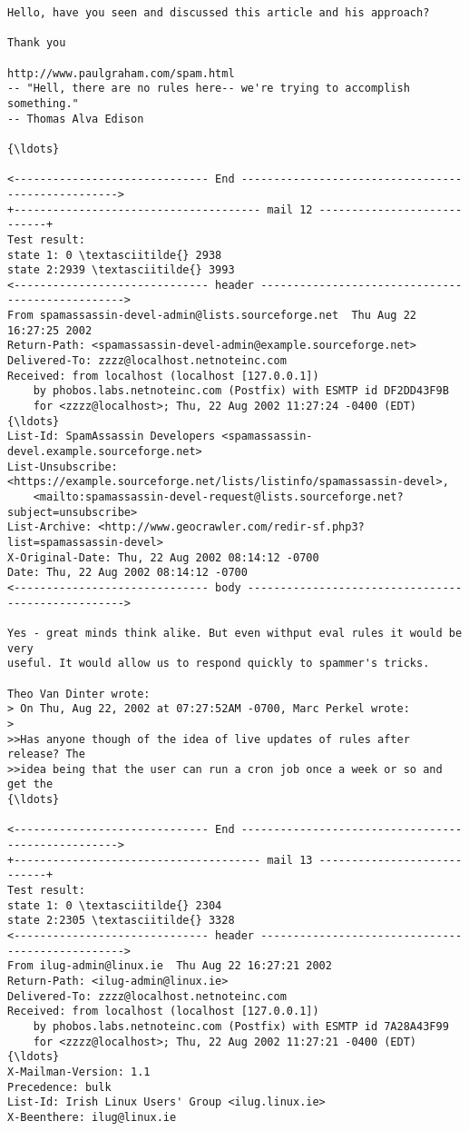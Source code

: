 \documentclass[11pt]{article}
\begin{document}
\begin{Verbatim}[commandchars=\\\{\}]
Hello, have you seen and discussed this article and his approach?

Thank you

http://www.paulgraham.com/spam.html
-- "Hell, there are no rules here-- we're trying to accomplish something."
-- Thomas Alva Edison

{\ldots}

<------------------------------ End --------------------------------------------------->
+-------------------------------------- mail 12 ----------------------------+
Test result:
state 1: 0 \textasciitilde{} 2938
state 2:2939 \textasciitilde{} 3993
<------------------------------ header ------------------------------------------------->
From spamassassin-devel-admin@lists.sourceforge.net  Thu Aug 22 16:27:25 2002
Return-Path: <spamassassin-devel-admin@example.sourceforge.net>
Delivered-To: zzzz@localhost.netnoteinc.com
Received: from localhost (localhost [127.0.0.1])
	by phobos.labs.netnoteinc.com (Postfix) with ESMTP id DF2DD43F9B
	for <zzzz@localhost>; Thu, 22 Aug 2002 11:27:24 -0400 (EDT)
{\ldots}
List-Id: SpamAssassin Developers <spamassassin-devel.example.sourceforge.net>
List-Unsubscribe: <https://example.sourceforge.net/lists/listinfo/spamassassin-devel>,
    <mailto:spamassassin-devel-request@lists.sourceforge.net?subject=unsubscribe>
List-Archive: <http://www.geocrawler.com/redir-sf.php3?list=spamassassin-devel>
X-Original-Date: Thu, 22 Aug 2002 08:14:12 -0700
Date: Thu, 22 Aug 2002 08:14:12 -0700
<------------------------------ body --------------------------------------------------->

Yes - great minds think alike. But even withput eval rules it would be very 
useful. It would allow us to respond quickly to spammer's tricks.

Theo Van Dinter wrote:
> On Thu, Aug 22, 2002 at 07:27:52AM -0700, Marc Perkel wrote:
> 
>>Has anyone though of the idea of live updates of rules after release? The 
>>idea being that the user can run a cron job once a week or so and get the 
{\ldots}

<------------------------------ End --------------------------------------------------->
+-------------------------------------- mail 13 ----------------------------+
Test result:
state 1: 0 \textasciitilde{} 2304
state 2:2305 \textasciitilde{} 3328
<------------------------------ header ------------------------------------------------->
From ilug-admin@linux.ie  Thu Aug 22 16:27:21 2002
Return-Path: <ilug-admin@linux.ie>
Delivered-To: zzzz@localhost.netnoteinc.com
Received: from localhost (localhost [127.0.0.1])
	by phobos.labs.netnoteinc.com (Postfix) with ESMTP id 7A28A43F99
	for <zzzz@localhost>; Thu, 22 Aug 2002 11:27:21 -0400 (EDT)
{\ldots}
X-Mailman-Version: 1.1
Precedence: bulk
List-Id: Irish Linux Users' Group <ilug.linux.ie>
X-Beenthere: ilug@linux.ie


\end{Verbatim}
\end{document}
